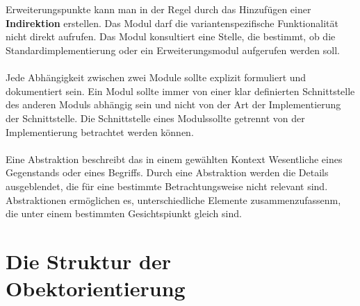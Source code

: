 \\\\
Erweiterungspunkte kann man in der Regel durch das Hinzufügen einer \textbf{Indirektion} erstellen. Das Modul darf die variantenspezifische Funktionalität nicht direkt aufrufen. Das Modul konsultiert eine Stelle, die bestimmt, ob die Standardimplementierung oder ein Erweiterungsmodul aufgerufen werden soll.
\\\\
Jede Abhängigkeit zwischen zwei Module sollte explizit formuliert und dokumentiert sein. Ein Modul sollte immer von einer klar definierten Schnittstelle des anderen Moduls abhängig sein und nicht von der Art der Implementierung der Schnittstelle. Die Schnittstelle eines Modulssollte getrennt von der Implementierung betrachtet werden können.
\\\\
Eine Abstraktion beschreibt das in einem gewählten Kontext Wesentliche eines Gegenstands oder eines Begriffs. Durch eine Abstraktion werden die Details ausgeblendet, die für eine bestimmte Betrachtungsweise nicht relevant sind. Abstraktionen ermöglichen es, unterschiedliche Elemente zusammenzufassenm, die unter einem bestimmten Gesichtspiunkt gleich sind.  
\section{Die Struktur der Obektorientierung}






